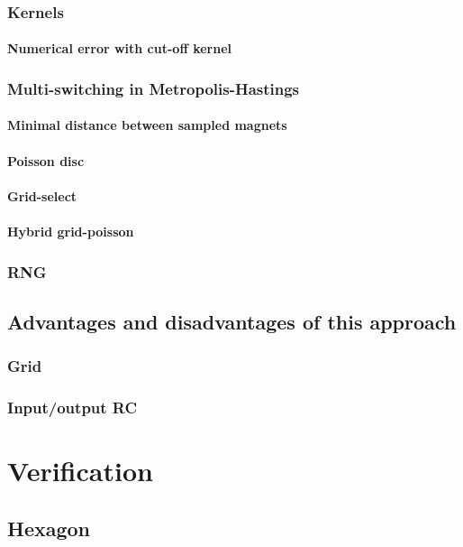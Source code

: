 \subsubsection{Kernels} %
\paragraph{Numerical error with cut-off kernel}
\subsubsection{Multi-switching in Metropolis-Hastings}
\paragraph{Minimal distance between sampled magnets} %
\paragraph{Poisson disc}
\paragraph{Grid-select}
\paragraph{Hybrid grid-poisson}
\subsubsection{RNG} %
\subsection{Advantages and disadvantages of this approach} %
\subsubsection{Grid}
\subsubsection{Input/output RC}

\section{Verification} %
\subsection{Hexagon}
